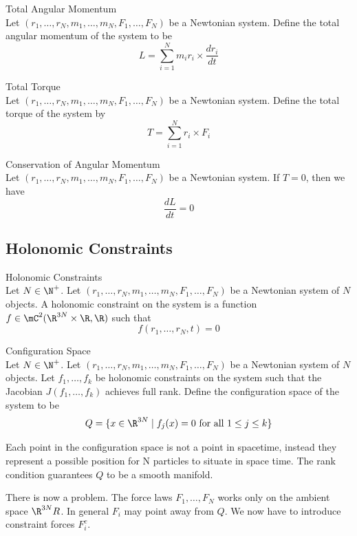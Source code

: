 \documentclass[a4paper]{article}
\begin{document}
\begin{defn}{Total Angular Momentum}{}\\
Let $(r_1,\dots,r_N,m_1,\dots,m_N,F_1,\dots,F_N)$ be a Newtonian system. Define the total angular momentum of the system to be $$L=\sum_{i=1}^Nm_ir_i\times\frac{dr_i}{dt}$$
\end{defn}

\begin{defn}{Total Torque}{}\\
Let $(r_1,\dots,r_N,m_1,\dots,m_N,F_1,\dots,F_N)$ be a Newtonian system. Define the total torque of the system by $$T=\sum_{i=1}^Nr_i\times F_i$$
\end{defn}

\begin{thm}{Conservation of Angular Momentum}{}\\
Let $(r_1,\dots,r_N,m_1,\dots,m_N,F_1,\dots,F_N)$ be a Newtonian system. If $T=0$, then we have $$\frac{dL}{dt}=0$$
\end{thm}

\subsection{Holonomic Constraints}
\begin{defn}{Holonomic Constraints}{}\\
Let $N\in\N^+$. Let $(r_1,\dots,r_N,m_1,\dots,m_N,F_1,\dots,F_N)$ be a Newtonian system of $N$ objects. A holonomic constraint on the system is a function $f\in\mC^2(\R^{3N}\times\R,\R)$ such that $$f(r_1,\dots,r_N,t)=0$$
\end{defn}

\begin{defn}{Configuration Space}{}\\
Let $N\in\N^+$. Let $(r_1,\dots,r_N,m_1,\dots,m_N,F_1,\dots,F_N)$ be a Newtonian system of $N$ objects. Let $f_1,\dots,f_k$ be holonomic constraints on the system such that the Jacobian $J(f_1,\dots,f_k)$ achieves full rank. Define the configuration space of the system to be $$Q=\{x\in\R^{3N}\;|\;f_j(x)=0\text{ for all }1\leq j\leq k\}$$
\end{defn}

Each point in the configuration space is not a point in spacetime, instead they represent a possible position for N particles to situate in space time. The rank condition guarantees $Q$ to be a smooth manifold. 

There is now a problem. The force laws $F_1,\dots,F_N$ works only on the ambient space $\R^{3N}R$. In general $F_i$ may point away from $Q$. We now have to introduce constraint forces $F_i^c$. 
\end{document}
